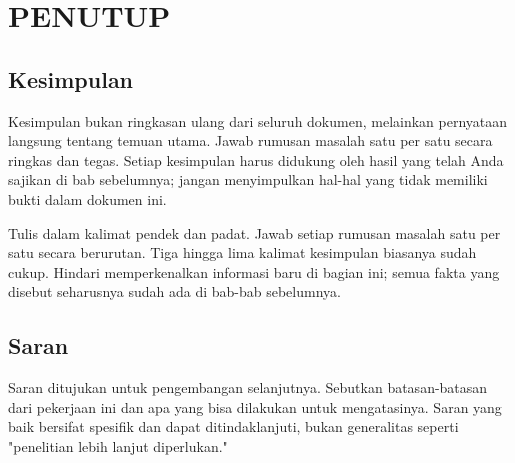\chapter{PENUTUP}

\section{Kesimpulan}
Kesimpulan bukan ringkasan ulang dari seluruh dokumen, melainkan pernyataan langsung tentang temuan utama. Jawab rumusan masalah satu per satu secara ringkas dan tegas. Setiap kesimpulan harus didukung oleh hasil yang telah Anda sajikan di bab sebelumnya; jangan menyimpulkan hal-hal yang tidak memiliki bukti dalam dokumen ini.

Tulis dalam kalimat pendek dan padat. Jawab setiap rumusan masalah satu per satu secara berurutan. Tiga hingga lima kalimat kesimpulan biasanya sudah cukup. Hindari memperkenalkan informasi baru di bagian ini; semua fakta yang disebut seharusnya sudah ada di bab-bab sebelumnya.

\section{Saran}
Saran ditujukan untuk pengembangan selanjutnya. Sebutkan batasan-batasan dari pekerjaan ini dan apa yang bisa dilakukan untuk mengatasinya. Saran yang baik bersifat spesifik dan dapat ditindaklanjuti, bukan generalitas seperti "penelitian lebih lanjut diperlukan."
